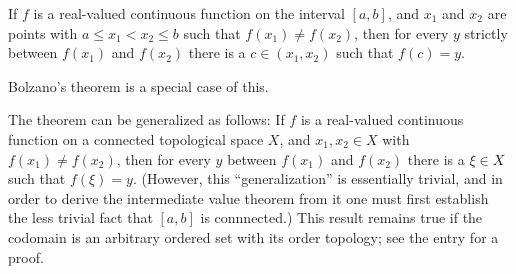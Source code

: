 \documentclass[12pt]{article}
\begin{document}

If $f$ is a real-valued continuous function on the interval $[a,b]$,
and $x_1$ and $x_2$ are points with $a\le x_1<x_2\le b$
such that $f(x_1)\ne f(x_2)$,
then for every $y$ strictly between $f(x_1)$ and $f(x_2)$
there is a $c\in(x_1,x_2)$ such that $f(c)=y$.

Bolzano's theorem is a special case of this.

The theorem can be generalized as follows:
If $f$ is a real-valued continuous function
on a connected topological space $X$,
and $x_1, x_2 \in X$ with $f(x_1) \ne f(x_2)$,
then for every $y$ between $f(x_1)$ and $f(x_2)$
there is a $\xi \in X$ such that $f(\xi) = y$.
(However, this ``generalization'' is essentially trivial,
and in order to derive the intermediate value theorem from it
one must first establish the less trivial fact that $[a,b]$ is connnected.)
This result remains true
if the codomain is an arbitrary ordered set with its order topology;
see the entry
for a proof.





\end{document}
